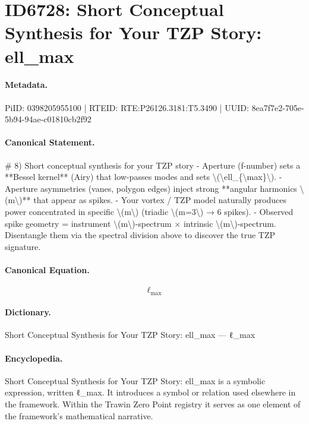 \section*{ID6728: Short Conceptual Synthesis for Your TZP Story: ell\_max}
\paragraph{Metadata.}
PiID: 0398205955100 | RTEID: RTE:P26126.3181:T5.3490 | UUID: 8ea7f7e2-705e-5b94-94ae-c01810cb2f92

\paragraph{Canonical Statement.}
\# 8) Short conceptual synthesis for your TZP story - Aperture (f-number) sets a **Bessel kernel** (Airy) that low-passes modes and sets \textbackslash{}(\textbackslash{}ell\_\{\textbackslash{}max\}\textbackslash{}). - Aperture asymmetries (vanes, polygon edges) inject strong **angular harmonics \textbackslash{}(m\textbackslash{})** that appear as spikes. - Your vortex / TZP model naturally produces power concentrated in specific \textbackslash{}(m\textbackslash{}) (triadic \textbackslash{}(m=3\textbackslash{}) → 6 spikes). - Observed spike geometry = instrument \textbackslash{}(m\textbackslash{})-spectrum × intrinsic \textbackslash{}(m\textbackslash{})-spectrum. Disentangle them via the spectral division above to discover the true TZP signature.

\paragraph{Canonical Equation.}
\[
\ell_{\max}
\]

\paragraph{Dictionary.}
Short Conceptual Synthesis for Your TZP Story: ell\_max — ℓ\_max

\paragraph{Encyclopedia.}
Short Conceptual Synthesis for Your TZP Story: ell\_max is a symbolic expression, written ℓ\_max. It introduces a symbol or relation used elsewhere in the framework. Within the Trawin Zero Point registry it serves as one element of the framework's mathematical narrative.
